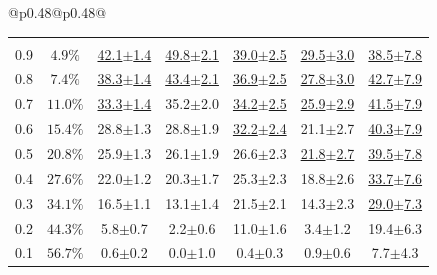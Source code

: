 \begin{table}[t]
\begin{tabular}{@{}p{}@{}p{}@{}}
{\begin{tabular}{c c c c c c c}
\midrule
\rowcolor{lightgray} \multicolumn{7}{c}{\rule{0pt}{2.2ex}\textbf{SubspacePath Pruner}\rule[-0.8ex]{0pt}{0pt}} \\
\rowcolor{white} 0.9 & $4.9\%$ & \underline{42.1{\scriptsize$\pm$1.4}} & \underline{49.8{\scriptsize$\pm$2.1}} & \underline{39.0{\scriptsize$\pm$2.5}} & \underline{29.5{\scriptsize$\pm$3.0}} & \underline{38.5{\scriptsize$\pm$7.8}} \\
\rowcolor{white} 0.8 & $7.4\%$ & \underline{38.3{\scriptsize$\pm$1.4}} & \underline{43.4{\scriptsize$\pm$2.1}} & \underline{36.9{\scriptsize$\pm$2.5}} & \underline{27.8{\scriptsize$\pm$3.0}} & \underline{42.7{\scriptsize$\pm$7.9}} \\
\rowcolor{white} 0.7 & $11.0\%$ & \underline{33.3{\scriptsize$\pm$1.4}} & 35.2{\scriptsize$\pm$2.0} & \underline{34.2{\scriptsize$\pm$2.5}} & \underline{25.9{\scriptsize$\pm$2.9}} & \underline{41.5{\scriptsize$\pm$7.9}} \\
\rowcolor{white} 0.6 & $15.4\%$ & 28.8{\scriptsize$\pm$1.3} & 28.8{\scriptsize$\pm$1.9} & \underline{32.2{\scriptsize$\pm$2.4}} & 21.1{\scriptsize$\pm$2.7} & \underline{40.3{\scriptsize$\pm$7.9}} \\
\rowcolor{white} 0.5 & $20.8\%$ & 25.9{\scriptsize$\pm$1.3} & 26.1{\scriptsize$\pm$1.9} & 26.6{\scriptsize$\pm$2.3} & \underline{21.8{\scriptsize$\pm$2.7}} & \underline{39.5{\scriptsize$\pm$7.8}} \\
\rowcolor{white} 0.4 & $27.6\%$ & 22.0{\scriptsize$\pm$1.2} & 20.3{\scriptsize$\pm$1.7} & 25.3{\scriptsize$\pm$2.3} & 18.8{\scriptsize$\pm$2.6} & \underline{33.7{\scriptsize$\pm$7.6}} \\
\rowcolor{white} 0.3 & $34.1\%$ & 16.5{\scriptsize$\pm$1.1} & 13.1{\scriptsize$\pm$1.4} & 21.5{\scriptsize$\pm$2.1} & 14.3{\scriptsize$\pm$2.3} & \underline{29.0{\scriptsize$\pm$7.3}} \\
\rowcolor{white} 0.2 & $44.3\%$ & 5.8{\scriptsize$\pm$0.7} & 2.2{\scriptsize$\pm$0.6} & 11.0{\scriptsize$\pm$1.6} & 3.4{\scriptsize$\pm$1.2} & 19.4{\scriptsize$\pm$6.3} \\
\rowcolor{white} 0.1 & $56.7\%$ & 0.6{\scriptsize$\pm$0.2} & 0.0{\scriptsize$\pm$1.0} & 0.4{\scriptsize$\pm$0.3} & 0.9{\scriptsize$\pm$0.6} & 7.7{\scriptsize$\pm$4.3} \\
\bottomrule
\end{tabular}
}
\end{tabular}
\label{tab:task_type_pruning}
\end{table}

